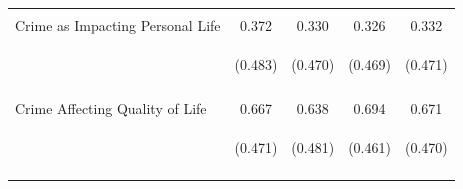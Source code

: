 \begin{center}
\begin{tabular}{lcccc}
 & \begin{footnotesize}\end{footnotesize} & \begin{footnotesize}\end{footnotesize} & \begin{footnotesize}\end{footnotesize} & \begin{footnotesize}\end{footnotesize}\\
\noalign{\smallskip}Crime as Impacting Personal Life  & 0.372 & 0.330 & 0.326 & 0.332\\
 & \begin{footnotesize}(0.483)\end{footnotesize} & \begin{footnotesize}(0.470)\end{footnotesize} & \begin{footnotesize}(0.469)\end{footnotesize} & \begin{footnotesize}(0.471)\end{footnotesize}\\
 & \begin{footnotesize}\end{footnotesize} & \begin{footnotesize}\end{footnotesize} & \begin{footnotesize}\end{footnotesize} & \begin{footnotesize}\end{footnotesize}\\
\noalign{\smallskip}Crime Affecting Quality of Life & 0.667 & 0.638 & 0.694 & 0.671\\
 & \begin{footnotesize}(0.471)\end{footnotesize} & \begin{footnotesize}(0.481)\end{footnotesize} & \begin{footnotesize}(0.461)\end{footnotesize} & \begin{footnotesize}(0.470)\end{footnotesize}\\
 & \begin{footnotesize}\end{footnotesize} & \begin{footnotesize}\end{footnotesize} & \begin{footnotesize}\end{footnotesize} & \begin{footnotesize}\end{footnotesize}\\

\end{tabular}
\end{center}
